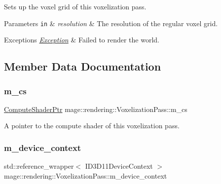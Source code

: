 Sets up the voxel grid of this voxelization pass.


\begin{DoxyParams}[1]{Parameters}
\mbox{\tt in}  & {\em resolution} & The resolution of the regular voxel grid. \\
\hline
\end{DoxyParams}

\begin{DoxyExceptions}{Exceptions}
{\em \mbox{\hyperlink{classmage_1_1_exception}{Exception}}} & Failed to render the world. \\
\hline
\end{DoxyExceptions}


\subsection{Member Data Documentation}
\mbox{\label{classmage_1_1rendering_1_1_voxelization_pass_ae3d844f54f0a3c1e2949b8cb38836eeb}} 
\subsubsection{\texorpdfstring{m\+\_\+cs}{m\_cs}}
{\footnotesize\ttfamily \mbox{\hyperlink{namespacemage_1_1rendering_ab3dc9f2114f2e9255b91d9c051da52ea}{Compute\+Shader\+Ptr}} mage\+::rendering\+::\+Voxelization\+Pass\+::m\+\_\+cs\hspace{0.3cm}{\ttfamily [private]}}

A pointer to the compute shader of this voxelization pass. \mbox{\label{classmage_1_1rendering_1_1_voxelization_pass_a44fc5652aed364651c7f58db658fc951}} 
\subsubsection{\texorpdfstring{m\+\_\+device\+\_\+context}{m\_device\_context}}
{\footnotesize\ttfamily std\+::reference\+\_\+wrapper$<$ I\+D3\+D11\+Device\+Context $>$ mage\+::rendering\+::\+Voxelization\+Pass\+::m\+\_\+device\+\_\+context\hspace{0.3cm}{\ttfamily [private]}}

